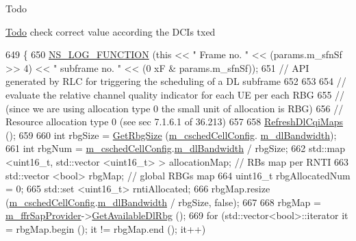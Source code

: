 \begin{DoxyRefDesc}{Todo}
\item[\hyperlink{todo__todo000132}{Todo}]check correct value according the D\+C\+Is txed \end{DoxyRefDesc}

\begin{DoxyCode}
649 \{
650   \hyperlink{log-macros-disabled_8h_a90b90d5bad1f39cb1b64923ea94c0761}{NS\_LOG\_FUNCTION} (\textcolor{keyword}{this} << \textcolor{stringliteral}{" Frame no. "} << (params.m\_sfnSf >> 4) << \textcolor{stringliteral}{" subframe no. "} << (0
      xF & params.m\_sfnSf));
651   \textcolor{comment}{// API generated by RLC for triggering the scheduling of a DL subframe}
652 
653 
654   \textcolor{comment}{// evaluate the relative channel quality indicator for each UE per each RBG}
655   \textcolor{comment}{// (since we are using allocation type 0 the small unit of allocation is RBG)}
656   \textcolor{comment}{// Resource allocation type 0 (see sec 7.1.6.1 of 36.213)}
657 
658   \hyperlink{classns3_1_1PfFfMacScheduler_a5388e0f10ab7d36f49d4eb66e53504bd}{RefreshDlCqiMaps} ();
659 
660   \textcolor{keywordtype}{int} rbgSize = \hyperlink{classns3_1_1PfFfMacScheduler_ae707fd496af66bc87fc7e51d212bafc3}{GetRbgSize} (\hyperlink{classns3_1_1PfFfMacScheduler_a0be1f7a1e78824b031e48208b8af1048}{m\_cschedCellConfig}.
      \hyperlink{structns3_1_1FfMacCschedSapProvider_1_1CschedCellConfigReqParameters_ad18c695bd3c9d7f742ba1dab4a941e8a}{m\_dlBandwidth});
661   \textcolor{keywordtype}{int} rbgNum = \hyperlink{classns3_1_1PfFfMacScheduler_a0be1f7a1e78824b031e48208b8af1048}{m\_cschedCellConfig}.\hyperlink{structns3_1_1FfMacCschedSapProvider_1_1CschedCellConfigReqParameters_ad18c695bd3c9d7f742ba1dab4a941e8a}{m\_dlBandwidth} / rbgSize;
662   std::map <uint16\_t, std::vector <uint16\_t> > allocationMap; \textcolor{comment}{// RBs map per RNTI}
663   std::vector <bool> rbgMap;  \textcolor{comment}{// global RBGs map}
664   uint16\_t rbgAllocatedNum = 0;
665   std::set <uint16\_t> rntiAllocated;
666   rbgMap.resize (\hyperlink{classns3_1_1PfFfMacScheduler_a0be1f7a1e78824b031e48208b8af1048}{m\_cschedCellConfig}.\hyperlink{structns3_1_1FfMacCschedSapProvider_1_1CschedCellConfigReqParameters_ad18c695bd3c9d7f742ba1dab4a941e8a}{m\_dlBandwidth} / rbgSize, \textcolor{keyword}{false});
667 
668   rbgMap = \hyperlink{classns3_1_1PfFfMacScheduler_a40519746bd3f39a4b664db3036f2e3fd}{m\_ffrSapProvider}->\hyperlink{classns3_1_1LteFfrSapProvider_ad60306dae43b74dc25b65f81d6587a24}{GetAvailableDlRbg} ();
669   \textcolor{keywordflow}{for} (std::vector<bool>::iterator it = rbgMap.begin (); it != rbgMap.end (); it++)

\end{DoxyCode}
